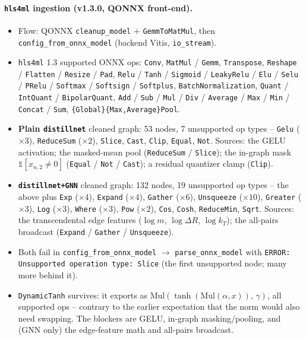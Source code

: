 \paragraph{\texttt{hls4ml} ingestion (v1.3.0, QONNX front-end).}
\begin{itemize}
    \item Flow: QONNX \texttt{cleanup\_model} $+$ \texttt{GemmToMatMul},
    then \texttt{config\_from\_onnx\_model} (backend Vitis,
    \texttt{io\_stream}).
    \item \texttt{hls4ml} 1.3 supported ONNX ops: \texttt{Conv},
    \texttt{MatMul} / \texttt{Gemm}, \texttt{Transpose},
    \texttt{Reshape} / \texttt{Flatten} / \texttt{Resize} / \texttt{Pad},
    \texttt{Relu} / \texttt{Tanh} / \texttt{Sigmoid} / \texttt{LeakyRelu} /
    \texttt{Elu} / \texttt{Selu} / \texttt{PRelu} / \texttt{Softmax} /
    \texttt{Softsign} / \texttt{Softplus}, \texttt{BatchNormalization},
    \texttt{Quant} / \texttt{IntQuant} / \texttt{BipolarQuant},
    \texttt{Add} / \texttt{Sub} / \texttt{Mul} / \texttt{Div} /
    \texttt{Average} / \texttt{Max} / \texttt{Min} / \texttt{Concat} /
    \texttt{Sum}, \texttt{\{Global\}\{Max,Average\}Pool}.
    \item \textbf{Plain \texttt{distillnet}} cleaned graph: 53 nodes,
    7 unsupported op types -- \texttt{Gelu} ($\times3$),
    \texttt{ReduceSum} ($\times2$), \texttt{Slice}, \texttt{Cast},
    \texttt{Clip}, \texttt{Equal}, \texttt{Not}. Sources: the GELU
    activation; the masked-mean pool (\texttt{ReduceSum} / \texttt{Slice});
    the in-graph mask $\mathbb{1}[x_{n,2}\neq0]$
    (\texttt{Equal} / \texttt{Not} / \texttt{Cast}); a residual
    quantizer clamp (\texttt{Clip}).
    \item \textbf{\texttt{distillnet+GNN}} cleaned graph: 132 nodes,
    19 unsupported op types -- the above plus \texttt{Exp} ($\times4$),
    \texttt{Expand} ($\times4$), \texttt{Gather} ($\times6$),
    \texttt{Unsqueeze} ($\times10$), \texttt{Greater} ($\times3$),
    \texttt{Log} ($\times3$), \texttt{Where} ($\times3$),
    \texttt{Pow} ($\times2$), \texttt{Cos}, \texttt{Cosh},
    \texttt{ReduceMin}, \texttt{Sqrt}. Sources: the transcendental edge
    features ($\log m$, $\log\Delta R$, $\log k_T$); the all-pairs
    broadcast (\texttt{Expand} / \texttt{Gather} / \texttt{Unsqueeze}).
    \item Both fail in \texttt{config\_from\_onnx\_model} $\to$
    \texttt{parse\_onnx\_model} with
    \texttt{ERROR: Unsupported operation type: Slice} (the first unsupported
    node; many more behind it).
    \item \texttt{DynamicTanh} survives: it exports as
    $\mathrm{Mul}(\tanh(\mathrm{Mul}(\alpha, x)),\,\gamma)$, all supported
    ops -- contrary to the earlier expectation that the norm would also
    need swapping. The blockers are GELU, in-graph masking/pooling, and
    (GNN only) the edge-feature math and all-pairs broadcast.
\end{itemize}

